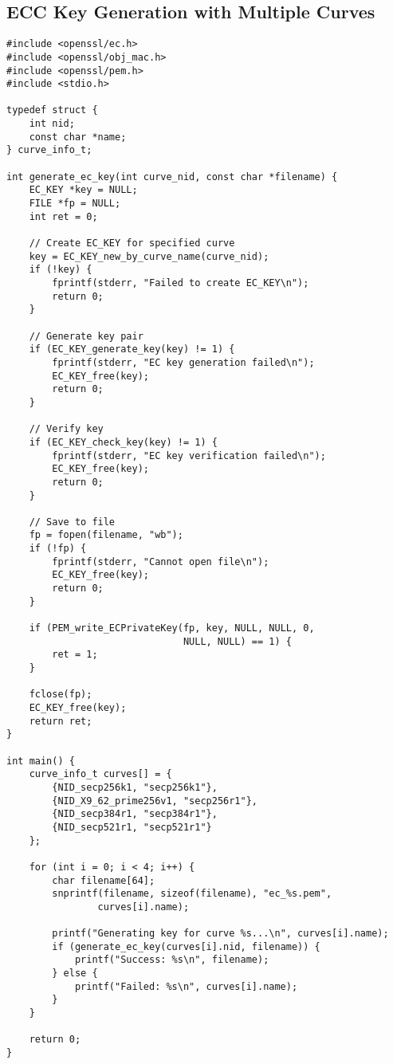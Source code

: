 \subsection{ECC Key Generation with Multiple Curves}

\begin{verbatim}
#include <openssl/ec.h>
#include <openssl/obj_mac.h>
#include <openssl/pem.h>
#include <stdio.h>

typedef struct {
    int nid;
    const char *name;
} curve_info_t;

int generate_ec_key(int curve_nid, const char *filename) {
    EC_KEY *key = NULL;
    FILE *fp = NULL;
    int ret = 0;
    
    // Create EC_KEY for specified curve
    key = EC_KEY_new_by_curve_name(curve_nid);
    if (!key) {
        fprintf(stderr, "Failed to create EC_KEY\n");
        return 0;
    }
    
    // Generate key pair
    if (EC_KEY_generate_key(key) != 1) {
        fprintf(stderr, "EC key generation failed\n");
        EC_KEY_free(key);
        return 0;
    }
    
    // Verify key
    if (EC_KEY_check_key(key) != 1) {
        fprintf(stderr, "EC key verification failed\n");
        EC_KEY_free(key);
        return 0;
    }
    
    // Save to file
    fp = fopen(filename, "wb");
    if (!fp) {
        fprintf(stderr, "Cannot open file\n");
        EC_KEY_free(key);
        return 0;
    }
    
    if (PEM_write_ECPrivateKey(fp, key, NULL, NULL, 0, 
                               NULL, NULL) == 1) {
        ret = 1;
    }
    
    fclose(fp);
    EC_KEY_free(key);
    return ret;
}

int main() {
    curve_info_t curves[] = {
        {NID_secp256k1, "secp256k1"},
        {NID_X9_62_prime256v1, "secp256r1"},
        {NID_secp384r1, "secp384r1"},
        {NID_secp521r1, "secp521r1"}
    };
    
    for (int i = 0; i < 4; i++) {
        char filename[64];
        snprintf(filename, sizeof(filename), "ec_%s.pem", 
                curves[i].name);
        
        printf("Generating key for curve %s...\n", curves[i].name);
        if (generate_ec_key(curves[i].nid, filename)) {
            printf("Success: %s\n", filename);
        } else {
            printf("Failed: %s\n", curves[i].name);
        }
    }
    
    return 0;
}
\end{verbatim}

